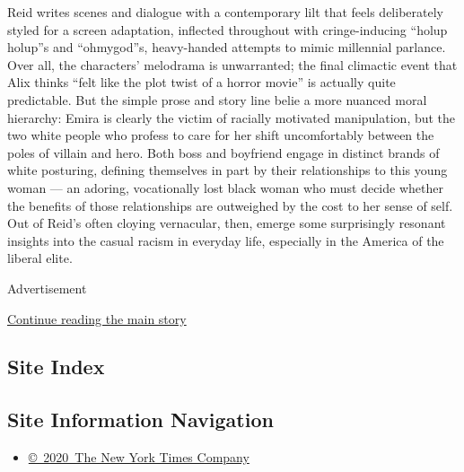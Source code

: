 Reid writes scenes and dialogue with a contemporary lilt that feels
deliberately styled for a screen adaptation, inflected throughout with
cringe-inducing ``holup holup''s and ``ohmygod''s, heavy-handed attempts
to mimic millennial parlance. Over all, the characters' melodrama is
unwarranted; the final climactic event that Alix thinks ``felt like the
plot twist of a horror movie'' is actually quite predictable. But the
simple prose and story line belie a more nuanced moral hierarchy: Emira
is clearly the victim of racially motivated manipulation, but the two
white people who profess to care for her shift uncomfortably between the
poles of villain and hero. Both boss and boyfriend engage in distinct
brands of white posturing, defining themselves in part by their
relationships to this young woman --- an adoring, vocationally lost
black woman who must decide whether the benefits of those relationships
are outweighed by the cost to her sense of self. Out of Reid's often
cloying vernacular, then, emerge some surprisingly resonant insights
into the casual racism in everyday life, especially in the America of
the liberal elite.

Advertisement

\protect\hyperlink{after-bottom}{Continue reading the main story}

\hypertarget{site-index}{%
\subsection{Site Index}\label{site-index}}

\hypertarget{site-information-navigation}{%
\subsection{Site Information
Navigation}\label{site-information-navigation}}

\begin{itemize}
\tightlist
\item
  \href{https://help.nytimes3xbfgragh.onion/hc/en-us/articles/115014792127-Copyright-notice}{©~2020~The
  New York Times Company}
\end{itemize}

